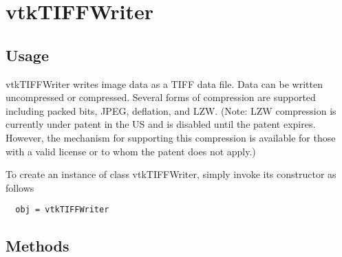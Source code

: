 \section{vtkTIFFWriter}

\subsection{Usage}

 vtkTIFFWriter writes image data as a TIFF data file. Data can be written
 uncompressed or compressed. Several forms of compression are supported
 including packed bits, JPEG, deflation, and LZW. (Note: LZW compression
 is currently under patent in the US and is disabled until the patent
 expires. However, the mechanism for supporting this compression is available
 for those with a valid license or to whom the patent does not apply.)

To create an instance of class vtkTIFFWriter, simply
invoke its constructor as follows
\begin{verbatim}
  obj = vtkTIFFWriter
\end{verbatim}
\subsection{Methods}

